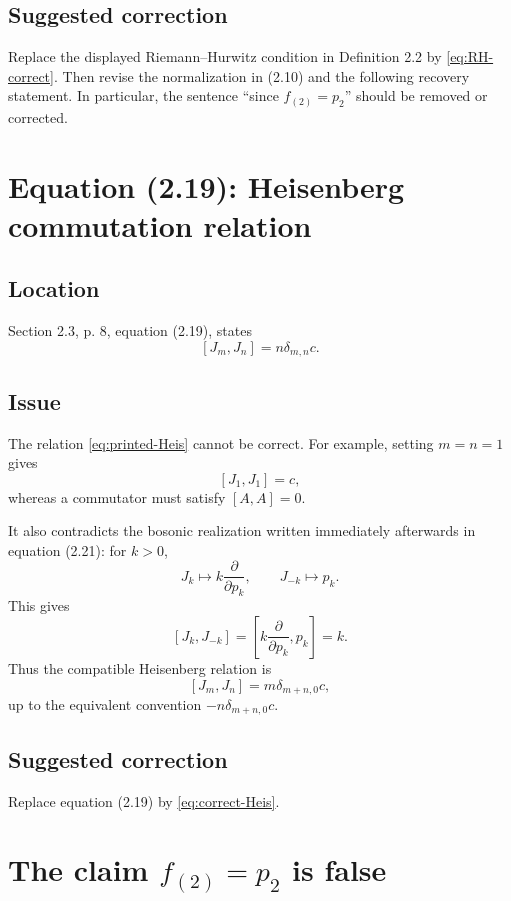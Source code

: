 \documentclass[11pt]{article}
\begin{document}
\subsection*{Suggested correction}
Replace the displayed Riemann--Hurwitz condition in Definition 2.2 by \eqref{eq:RH-correct}.  Then revise the normalization in (2.10) and the following recovery statement.  In particular, the sentence ``since $f_{(2)}=p_2$'' should be removed or corrected.

\section{Equation (2.19): Heisenberg commutation relation}

\subsection*{Location}
Section 2.3, p. 8, equation (2.19), states
\begin{equation}\label{eq:printed-Heis}
   [J_m,J_n]=n\delta_{m,n}c.
\end{equation}

\subsection*{Issue}
The relation \eqref{eq:printed-Heis} cannot be correct.  For example, setting $m=n=1$ gives
\[
   [J_1,J_1]=c,
\]
whereas a commutator must satisfy $[A,A]=0$.

It also contradicts the bosonic realization written immediately afterwards in equation (2.21): for $k>0$,
\[
   J_k\mapsto k\frac{\partial}{\partial p_k},\qquad J_{-k}\mapsto p_k.
\]
This gives
\[
   [J_k,J_{-k}]
   =\left[k\frac{\partial}{\partial p_k},p_k\right]=k.
\]
Thus the compatible Heisenberg relation is
\begin{equation}\label{eq:correct-Heis}
   [J_m,J_n]=m\delta_{m+n,0}c,
\end{equation}
up to the equivalent convention $-n\delta_{m+n,0}c$.

\subsection*{Suggested correction}
Replace equation (2.19) by \eqref{eq:correct-Heis}.

\section{The claim $f_{(2)}=p_2$ is false}\label{sec:f2p2}
\end{document}
